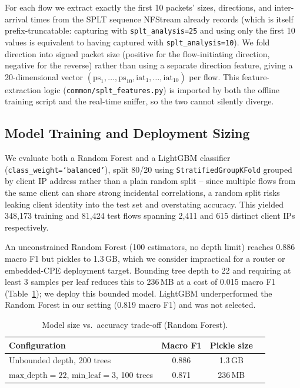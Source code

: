 \documentclass[10pt,twocolumn]{article}
\begin{document}
For each flow we extract exactly the first 10 packets' sizes, directions,
and inter-arrival times from the SPLT sequence NFStream already records
(which is itself prefix-truncatable: capturing with
\texttt{splt\_analysis=25} and using only the first 10 values is
equivalent to having captured with \texttt{splt\_analysis=10}). We fold
direction into signed packet size (positive for the flow-initiating
direction, negative for the reverse) rather than using a separate
direction feature, giving a 20-dimensional vector
\((\text{ps}_1,\ldots,\text{ps}_{10}, \text{iat}_1,\ldots,\text{iat}_{10})\)
per flow. This feature-extraction logic
(\texttt{common/splt\_features.py}) is imported by both the offline
training script and the real-time sniffer, so the two cannot silently
diverge.

\subsection{Model Training and Deployment Sizing}

We evaluate both a Random Forest and a LightGBM classifier
(\texttt{class\_weight=`balanced'}), split 80/20 using
\texttt{StratifiedGroupKFold} grouped by client IP address rather than a
plain random split -- since multiple flows from the same client can share
strong incidental correlations, a random split risks leaking client
identity into the test set and overstating accuracy. This yielded
348{,}173 training and 81{,}424 test flows spanning 2{,}411 and 615
distinct client IPs respectively.

An unconstrained Random Forest (100 estimators, no depth limit) reaches
0.886 macro F1 but pickles to 1.3\,GB, which we consider impractical for
a router or embedded-CPE deployment target. Bounding tree depth to 22 and
requiring at least 3 samples per leaf reduces this to 236\,MB at a cost
of 0.015 macro F1 (Table~\ref{tab:sizing}); we deploy this bounded model.
LightGBM underperformed the Random Forest in our setting (0.819 macro
F1) and was not selected.

\begin{table}[t]
\centering
\caption{Model size vs.\ accuracy trade-off (Random Forest).}
\label{tab:sizing}
\begin{tabular}{lccc}
\toprule
Configuration & Macro F1 & Pickle size \\
\midrule
Unbounded depth, 200 trees & 0.886 & 1.3\,GB \\
\(\text{max\_depth}=22\), \(\text{min\_leaf}=3\), 100 trees & 0.871 & 236\,MB \\
\bottomrule
\end{tabular}
\end{table}
\end{document}
